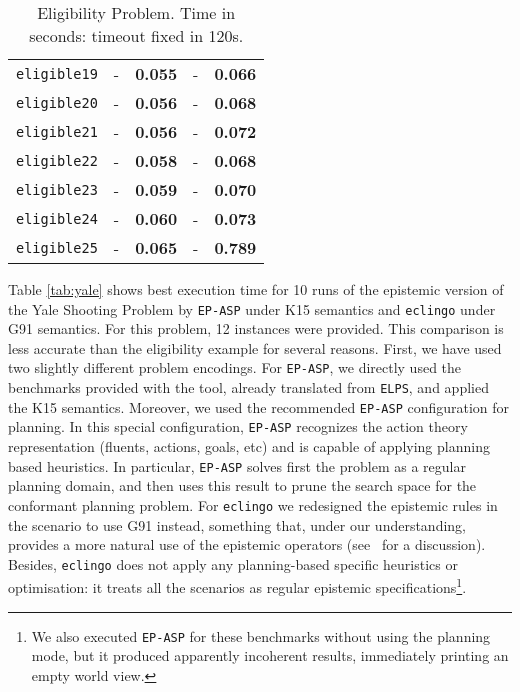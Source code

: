 \documentclass{new_tlp}
\def\eclingo{{\tt eclingo}}
\def\\wviews{{\tt \wviews}}
\def\wviews{{\tt wviews}}
\def\EPASP{{\tt EP-ASP}}
\begin{document}
\begin{table}[ht]
\begin{tabular}{c|rr|rr}
    \texttt{eligible19} & -          & {\bf 0.055}       & -          & {\bf 0.066}       \\
    \texttt{eligible20} & -          & {\bf 0.056}       & -          & {\bf 0.068}       \\
    \texttt{eligible21} & -          & {\bf 0.056}       & -          & {\bf 0.072}       \\
    \texttt{eligible22} & -          & {\bf 0.058}       & -          & {\bf 0.068}       \\
    \texttt{eligible23} & -          & {\bf 0.059}       & -          & {\bf 0.070}       \\
    \texttt{eligible24} & -          & {\bf 0.060}       & -          & {\bf 0.073}       \\
    \texttt{eligible25} & -          & {\bf 0.065}       & -          & {\bf 0.789}       \\ \hline
    \end{tabular}
\caption{Eligibility Problem. Time in seconds: timeout fixed in 120s.}
\label{tab:eligible}
\end{table}

Table \ref{tab:yale} shows best execution time for 10 runs of the epistemic version of the Yale Shooting Problem by \EPASP{} under K15 semantics and \eclingo{} under G91 semantics. For this problem, 12 instances were provided. This comparison is less accurate than the eligibility example for several reasons. First, we have used two slightly different problem encodings. For \EPASP{}, we directly used the benchmarks provided with the tool, already translated from {\tt ELPS}, and applied the K15 semantics. Moreover, we used the recommended \EPASP{} configuration for planning. In this special configuration, \EPASP{} recognizes the action theory representation (fluents, actions, goals, etc) and is capable of applying planning based heuristics. In particular, \EPASP{} solves first the problem as a regular planning domain, and then uses this result to prune the search space for the conformant planning problem. For \eclingo{} we redesigned the epistemic rules in the scenario to use G91 instead, something that, under our understanding, provides a more natural use of the epistemic operators (see~\cite{cafafa19a} for a discussion). Besides, \eclingo{} does not apply any planning-based specific heuristics or optimisation: it treats all the scenarios as regular epistemic specifications\footnote{We also executed \EPASP{} for these benchmarks without using the planning mode, but it produced apparently incoherent results, immediately printing an empty world view.}.
\end{document}
